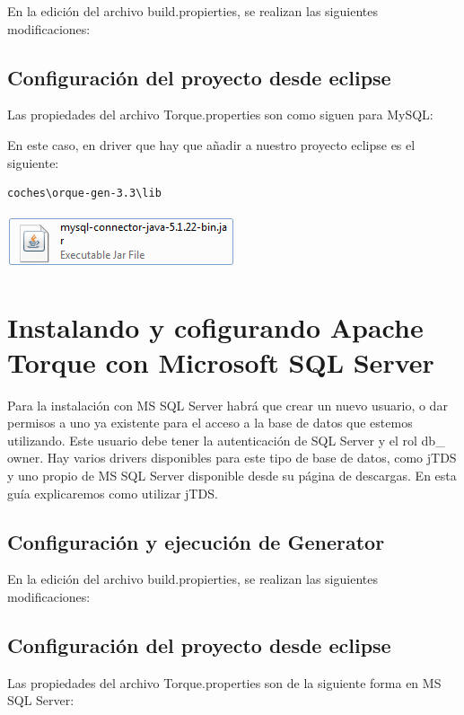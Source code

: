 \documentclass[12pt, oneside]{article}
\begin{document}
En la edición del archivo build.propierties, se realizan las siguientes modificaciones:


\subsection{Configuración del proyecto desde eclipse}
Las propiedades del archivo Torque.properties son como siguen para MySQL:



En este caso, en driver que hay que añadir a nuestro proyecto eclipse es el siguiente:
\begin{lstlisting}
coches\orque-gen-3.3\lib
\end{lstlisting}

\begin{center}
	\includegraphics{img/mysql-file.png}
\end{center}

\section{Instalando y cofigurando Apache Torque con Microsoft SQL Server}
Para la instalación con MS SQL Server habrá que crear un nuevo usuario, o dar permisos a uno ya existente para el acceso a la base de datos que estemos utilizando. Este usuario debe tener la autenticación de SQL Server y el rol db\_ owner. Hay varios drivers disponibles para este tipo de base de datos, como jTDS y uno propio de MS SQL Server disponible desde su página de descargas. En esta guía explicaremos como utilizar jTDS.

\subsection{Configuración y ejecución de Generator}
En la edición del archivo build.propierties, se realizan las siguientes modificaciones:



\subsection{Configuración del proyecto desde eclipse}
Las propiedades del archivo Torque.properties son de la siguiente forma en MS SQL Server:

\end{document}
